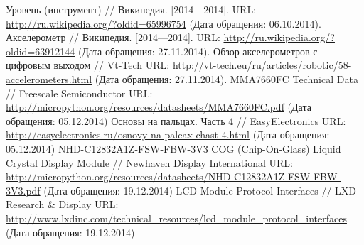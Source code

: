 \documentclass[document.tex]{subfiles}
\begin{document}
\clearpage
{}
\begin{thebibliography}{@@@@}	
		Уровень (инструмент) // Википедия. [2014—2014].
		URL: {\url{http://ru.wikipedia.org/?oldid=65996754}} 
		(Дата обращения: 06.10.2014).
		Акселерометр // Википедия. [2014—2014]. 
		URL: {\url{http://ru.wikipedia.org/?oldid=63912144}}
		(Дата обращения: 27.11.2014).
		Обзор акселерометров с цифровым выходом // Vt-Tech
		URL: {\url{http://vt-tech.eu/ru/articles/robotic/58-accelerometers.html}}
		(Дата обращения: 27.11.2014).
		MMA7660FC Technical Data // Freescale Semiconductor
		URL: {\url{http://micropython.org/resources/datasheets/MMA7660FC.pdf}}
		(Дата обращения: 05.12.2014)
		Основы на пальцах. Часть 4 // EasyElectronics
		URL: {\url{http://easyelectronics.ru/osnovy-na-palcax-chast-4.html}}
		(Дата обращения: 05.12.2014)
		NHD-C12832A1Z-FSW-FBW-3V3 COG (Chip-On-Glass) Liquid Crystal Display Module // Newhaven Display International
		URL: {\url{http://micropython.org/resources/datasheets/NHD-C12832A1Z-FSW-FBW-3V3.pdf}}
		(Дата обращения: 19.12.2014)
		LCD Module Protocol Interfaces // LXD Research & Display
		URL: {\url{http://www.lxdinc.com/technical_resources/lcd_module_protocol_interfaces}}
		(Дата обращения: 19.12.2014)
	\end{thebibliography}
\end{document}
